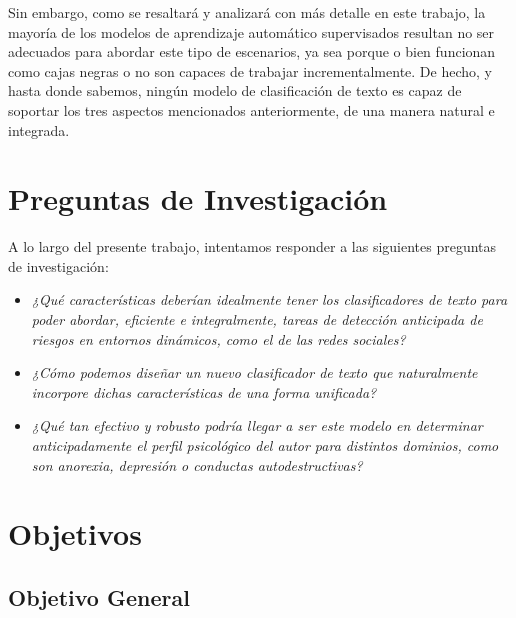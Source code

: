 Sin embargo, como se resaltará y analizará con más detalle en este trabajo, la mayoría de los modelos de aprendizaje automático supervisados resultan no ser adecuados para abordar este tipo de escenarios, ya sea porque o bien funcionan como cajas negras o no son capaces de trabajar incrementalmente. De hecho, y hasta donde sabemos, ningún modelo de clasificación de texto es capaz de soportar los tres aspectos mencionados anteriormente, de una manera natural e integrada.


\section{Preguntas de Investigación}


A lo largo del presente trabajo, intentamos responder a las siguientes preguntas de investigación:

\begin{itemize}
    \item[\textbf{P1:}] \emph{¿Qué características deberían idealmente tener los clasificadores de texto para poder abordar, eficiente e integralmente, tareas de detección anticipada de riesgos en entornos dinámicos, como el de las redes sociales?}
    \item[\textbf{P2:}] \emph{¿Cómo podemos diseñar un nuevo clasificador de texto que naturalmente incorpore dichas características de una forma unificada?}
    \item[\textbf{P3:}] \emph{¿Qué tan efectivo y robusto podría llegar a ser este modelo en determinar anticipadamente el perfil psicológico del autor para distintos dominios, como son anorexia, depresión o conductas autodestructivas?}
\end{itemize}

\section{Objetivos}
\label{sec:objetivos}

\subsection{Objetivo General}

